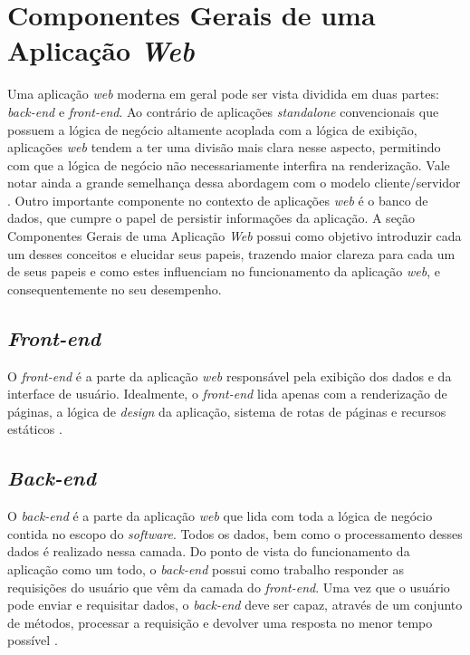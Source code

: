 \section{Componentes Gerais de uma Aplicação \textit{Web}}

Uma aplicação \textit{web} moderna em geral pode ser vista dividida em duas partes: \textit{back-end} e \textit{front-end}. Ao contrário de aplicações \textit{standalone} convencionais que possuem a lógica de negócio altamente acoplada com a lógica de exibição, aplicações \textit{web} tendem a ter uma divisão mais clara nesse aspecto, permitindo com que a lógica de negócio não necessariamente interfira na renderização. Vale notar ainda a grande semelhança dessa abordagem com o modelo cliente/servidor \cite{gong2020architecture}. Outro importante componente no contexto de aplicações \textit{web} é o banco de dados, que cumpre o papel de persistir informações da aplicação. A seção Componentes Gerais de uma Aplicação \textit{Web} possui como objetivo introduzir cada um desses conceitos e elucidar seus papeis, trazendo maior clareza para cada um de seus papeis e como estes influenciam no funcionamento da aplicação \textit{web}, e consequentemente no seu desempenho.

\subsection{\textit{Front-end}}

O \textit{front-end} é a parte da aplicação \textit{web} responsável pela exibição dos dados e da interface de usuário. Idealmente, o \textit{front-end} lida apenas com a renderização de páginas, a lógica de \textit{design} da aplicação, sistema de rotas de páginas e recursos estáticos \cite{gong2020architecture}.

\subsection{\textit{Back-end}}

O \textit{back-end} é a parte da aplicação \textit{web} que lida com toda a lógica de negócio contida no escopo do \textit{software}. Todos os dados, bem como o processamento desses dados é realizado nessa camada. Do ponto de vista do funcionamento da aplicação como um todo, o \textit{back-end} possui como trabalho responder as requisições do usuário que vêm da camada do \textit{front-end}. Uma vez que o usuário pode enviar e requisitar dados, o \textit{back-end} deve ser capaz, através de um conjunto de métodos, processar a requisição e devolver uma resposta no menor tempo possível \cite{adam2019backend}.

